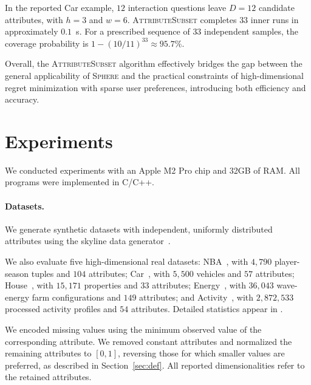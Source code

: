\documentclass[conference]{IEEEtran}
\theoremstyle{definition}
\theoremstyle{plain}
\newcommand{\technicalreport}{\iftoggle{LinkTechnicalReport}{\href{https://github.com/JunyuLiao/High-dimensional-Regret-Minimization/blob/main/docs/TechnicalReport.pdf}{technical report}}{technical report}}
\begin{document}
In the reported Car example, $12$ interaction questions leave $D=12$ candidate attributes, with $h=3$ and $w=6$. \textsc{AttributeSubset} completes $33$ inner runs in approximately $0.1$~s. For a prescribed sequence of $33$ independent samples, the coverage probability is $1-(10/11)^{33}\approx95.7\%$.

Overall, the \textsc{AttributeSubset} algorithm effectively bridges the gap between the general applicability of \textsc{Sphere} and the practical constraints of high-dimensional regret minimization with sparse user preferences, introducing both efficiency and accuracy.

\FloatBarrier



\section{Experiments}
\label{sec:eval}

We conducted experiments with an Apple M2 Pro chip and 32GB of RAM. All programs were implemented in C/C++.

\paragraph{\textbf{Datasets. }}
We generate synthetic datasets with independent, uniformly distributed attributes using the skyline data generator~\cite{borzsony2001skyline}.

We also evaluate five high-dimensional real datasets: NBA~\cite{basketballReference}, with $4{,}790$ player-season tuples and $104$ attributes; Car~\cite{epaAutomotiveTrends}, with $5{,}500$ vehicles and $57$ attributes; House~\cite{house_austin}, with $15{,}171$ properties and $33$ attributes; Energy~\cite{large-scale_wave_energy_farm_882}, with $36{,}043$ wave-energy farm configurations and $149$ attributes; and Activity~\cite{pamap2_physical_activity_monitoring_231}, with $2{,}872{,}533$ processed activity profiles and $54$ attributes. Detailed statistics appear in \iftoggle{TechnicalReport}{Section~\ref{appen:setting} of the \technicalreport}{Appendix~\ref{appen:setting}}.

We encoded missing values using the minimum observed value of the corresponding attribute. We removed constant attributes and normalized the remaining attributes to $[0,1]$, reversing those for which smaller values are preferred, as described in Section~\ref{sec:def}. All reported dimensionalities refer to the retained attributes.
\end{document}
